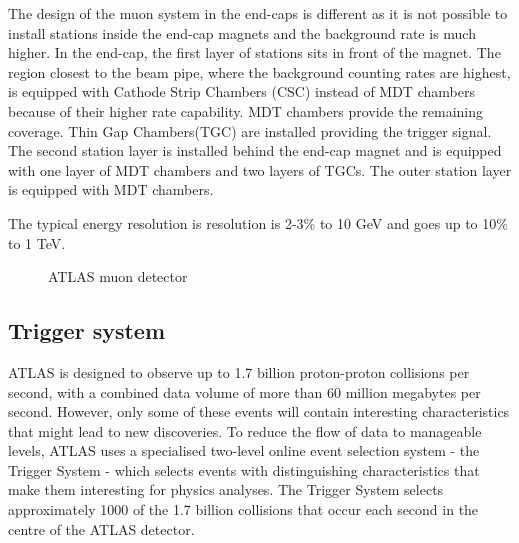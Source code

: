 \documentclass[a4paper, oneside]{book}
\begin{document}
					The design of the muon system in the end-caps is different as it is not possible to install stations inside the end-cap magnets and the background rate is much higher. In the end-cap, the first layer of stations sits in front of the magnet. The region closest to the beam pipe, where the background counting rates are highest, is equipped with Cathode Strip Chambers (CSC) instead of MDT chambers because of their higher rate capability. MDT chambers provide the remaining coverage. Thin Gap Chambers(TGC) are installed providing the trigger signal. The second station layer is installed behind the end-cap magnet and is equipped with one layer of MDT chambers and two layers of TGCs. The outer station layer is equipped with MDT chambers.
					
					The typical energy resolution is resolution is 2-3\% to 10 GeV and goes up to 10\% to 1 TeV.
					\begin{figure} [H]
						\centering
						 \quad
						\caption{ATLAS muon detector}
						\label{fig:ATLAS muon detector}
					\end{figure}
				
				\subsection{Trigger system}
					\cite{Trigger intro}ATLAS is designed to observe up to 1.7 billion proton-proton collisions per second, with a combined data volume of more than 60 million megabytes per second. However, only some of these events will contain interesting characteristics that might lead to new discoveries. To reduce the flow of data to manageable levels, ATLAS uses a specialised two-level online event selection system - the Trigger System - which selects events with distinguishing characteristics that make them interesting for physics analyses. The Trigger System selects approximately 1000 of the 1.7 billion collisions that occur each second in the centre of the ATLAS detector. 
				
\end{document}
